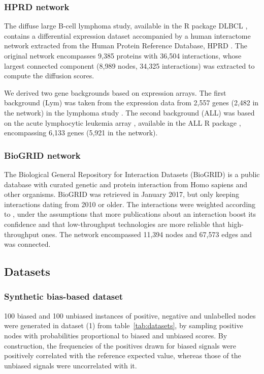 \documentclass[final]{bioinfo}
\begin{document}
\begin{methods}
\subsubsection*{HPRD network}

The diffuse large B-cell lymphoma study, available in the R package DLBCL \citep{dlbcl_package}, contains a differential expression dataset accompanied by a human interactome network extracted from the Human Protein Reference Database, HPRD \citep{hprd}. 
The original network encompasses 9,385 proteins with 36,504 interactions, whose largest connected component (8,989 nodes, 34,325 interactions) was extracted to compute the diffusion scores. 

We derived two gene backgrounds based on expression arrays. 
The first background (Lym) was taken from the expression data from 2,557 genes (2,482 in the network) in the lymphoma study \citep{lym_array}. 
The second background (ALL) was based on the acute lymphocytic leukemia array \citep{all_array}, available in the ALL R package \citep{all_package}, encompassing 6,133 genes (5,921 in the network). 

\subsubsection*{BioGRID network}

The Biological General Repository for Interaction Datasets (BioGRID) \citep{biogrid2017} is a public database with curated genetic and protein interaction from Homo sapiens and other organisms. 
BioGRID was retrieved in January 2017, but only keeping interactions dating from 2010 or older. 
The interactions were weighted according to \citep{pathways_confidence_dsd}, under the assumptions that more publications about an interaction boost its confidence and that low-throughput technologies are more reliable that high-throughput ones. 
The network encompassed 11,394 nodes and 67,573 edges and was connected.

\subsection*{Datasets}

\subsubsection*{Synthetic bias-based dataset}

100 biased and 100 unbiased instances of positive, negative and unlabelled nodes were generated in dataset (1) from table~\ref{tab:datasets}, by sampling positive nodes with probabilities proportional to biased and unbiased scores. 
By construction, the frequencies of the positives drawn for biased signals were positively correlated with the reference expected value, whereas those of the unbiased signals were uncorrelated with it.


\end{methods}
\end{document}
